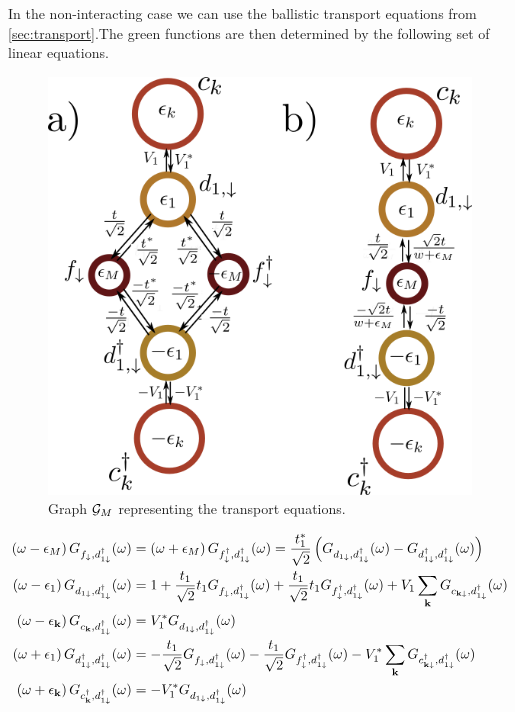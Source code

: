 In the non-interacting case we can use the ballistic transport equations from \ref{sec:transport}.The green functions are then determined by the following set of linear equations. 

\begin{figure}[t]
\centering
\includegraphics[scale=0.5]{IMAGES/Majorana/Grenn-Majorana.png}
\caption{ Graph $\mathcal{G}_M$ representing the transport equations.  \label{fig:green-M-QD} \protect{}}
\end{figure}


\begin{align}
    \left(\omega-\epsilon_{M}\right)G_{f_{\downarrow},d_{1\downarrow}^{\dagger}}(\omega)&=\left(\omega+\epsilon_{M}\right)G_{f_{\downarrow}^{\dagger},d_{1\downarrow}^{\dagger}}(\omega)=\frac{t^*_1}{\sqrt{2}}\left(G_{d_{1\downarrow},d_{1\downarrow}^{\dagger}}(\omega)-G_{d_{1\downarrow}^{\dagger},d_{1\downarrow}^{\dagger}}(\omega)\right)\\
    \left(\omega-\epsilon_{1}\right)G_{d_{1\downarrow},d_{1\downarrow}^{\dagger}}(\omega)&=1+\frac{t_1}{\sqrt{2}}t_{1}G_{f_{\downarrow},d_{1\downarrow}^{\dagger}}(\omega)+\frac{t_1}{\sqrt{2}}t_{1}G_{f_{\downarrow}^{\dagger},d_{1\downarrow}^{\dagger}}(\omega)+V_{1}\sum_{\mathbf{k}}G_{c_{\mathbf{k\downarrow}},d_{1\downarrow}^{\dagger}}(\omega)\\
    \left(\omega-\epsilon_{\mathbf{k}}\right)G_{c_{\mathbf{k}},d_{1\downarrow}^{\dagger}}(\omega)&=V_{1}^{*}G_{d_{1\downarrow},d_{1\downarrow}^{\dagger}}(\omega)\\
    \left(\omega+\epsilon_{1}\right)G_{d_{1\downarrow}^{\dagger},d_{1\downarrow}^{\dagger}}(\omega)&=-\frac{t_1}{\sqrt{2}}G_{f_{\downarrow},d_{1\downarrow}^{\dagger}}(\omega)-\frac{t_1}{\sqrt{2}}G_{f_{\downarrow}^{\dagger},d_{1\downarrow}^{\dagger}}(\omega)-V_{1}^{*}\sum_{\mathbf{k}}G_{c_{\mathbf{k\downarrow}}^{\dagger},d_{1\downarrow}^{\dagger}}(\omega)\\
    \left(\omega+\epsilon_{\mathbf{k}}\right)G_{c^\dagger_{\mathbf{k}},d_{1\downarrow}^{\dagger}}(\omega)&=-V_{1}^{*}G_{d_{1\downarrow},d_{1\downarrow}^{\dagger}}(\omega)
\end{align}


